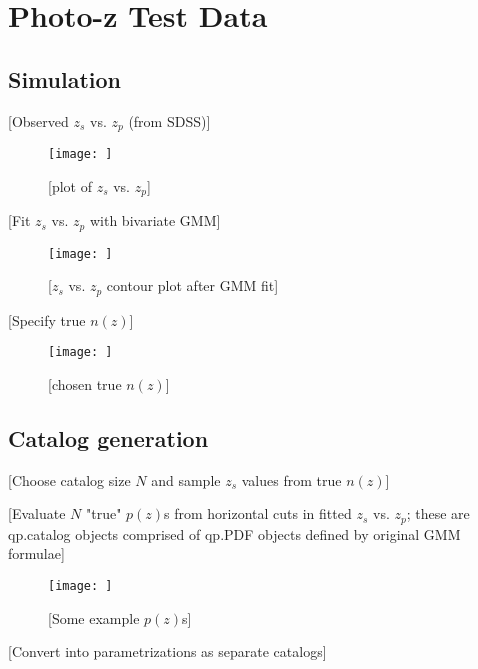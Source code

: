 \documentclass[\docopts]{\docclass}
\begin{document}

\section{Photo-z Test Data}
\label{sec:data}

\subsection{Simulation}
\label{sec:mock}

[Observed $z_{s}$ vs. $z_{p}$ (from SDSS)]

\begin{figure}
\texttt{[image: ]}
\caption{[plot of $z_{s}$ vs. $z_{p}$]\label{fig:observed}}
\end{figure}

[Fit $z_{s}$ vs. $z_{p}$ with bivariate GMM]

\begin{figure}
\texttt{[image: ]}
\caption{[$z_{s}$ vs. $z_{p}$ contour plot after GMM fit]\label{fig:fit}}
\end{figure}

[Specify true $n(z)$]

\begin{figure}
\texttt{[image: ]}
\caption{[chosen true $n(z)$]\label{fig:nz}}
\end{figure}

\subsection{Catalog generation}
\label{sec:catalogs}

[Choose catalog size $N$ and sample $z_{s}$ values from true $n(z)$]

[Evaluate $N$ "true" $p(z)$s from horizontal cuts in fitted $z_{s}$ vs. $z_{p}$; these are qp.catalog objects comprised of qp.PDF objects defined by original GMM formulae]

\begin{figure}
\texttt{[image: ]}
\caption{[Some example $p(z)$s]\label{fig:pzs}}
\end{figure}

[Convert into parametrizations as separate catalogs]

\end{document}
